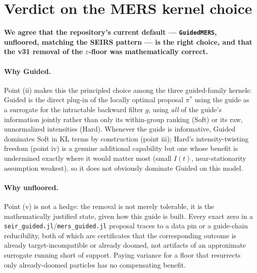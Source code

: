 \documentclass[11pt]{article}
\theoremstyle{plain}
\begin{document}
\section{Verdict on the MERS kernel choice}
\label{sec:verdict}

\textbf{We agree that the repository's current default --- \texttt{GuidedMERS}, unfloored, matching
the SEIRS pattern --- is the right choice, and that the v31 removal of the $\varepsilon$-floor was
mathematically correct.}

\paragraph{Why Guided.} Point (ii) makes this the principled choice among the three guided-family
kernels: Guided is the direct plug-in of the locally optimal proposal $\pi^*$ using the guide as a
surrogate for the intractable backward filter $g$, using \emph{all} of the guide's information
jointly rather than only its within-group ranking (Soft) or its raw, unnormalized intensities
(Hard). Whenever the guide is informative, Guided dominates Soft in KL terms by construction (point
iii); Hard's intensity-twisting freedom (point iv) is a genuine additional capability but one whose
benefit is undermined exactly where it would matter most (small $I(t)$, near-stationarity assumption
weakest), so it does not obviously dominate Guided on this model.

\paragraph{Why unfloored.} Point (v) is not a hedge: the removal is not merely tolerable, it is the
mathematically justified state, given how this guide is built. Every exact zero in a
\texttt{seir\_guided.jl}/\texttt{mers\_guided.jl} proposal traces to a data pin or a guide-chain
reducibility, both of which are certificates that the corresponding outcome is already
target-incompatible or already doomed, not artifacts of an approximate surrogate running short of
support. Paying variance for a floor that resurrects only already-doomed particles has no
compensating benefit.
\end{document}
